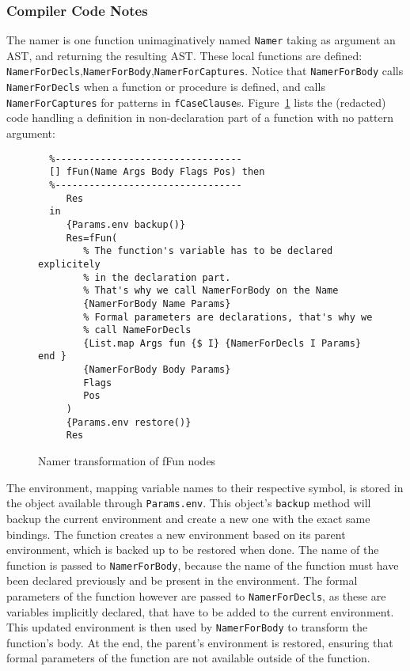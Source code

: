 \documentclass[a4paper]{memoir}
\begin{document}


\subsubsection{Compiler Code Notes}
The namer is one function unimaginatively named \lstinline!Namer! taking as argument an AST, and returning the resulting AST.
These local functions are defined: \lstinline!NamerForDecls!,\lstinline!NamerForBody!,\lstinline!NamerForCaptures!.
Notice that \lstinline!NamerForBody! calls \lstinline!NamerForDecls! when a function or procedure is
defined, and calls \lstinline!NamerForCaptures! for patterns in \lstinline!fCaseClause!s. 
Figure~\ref{fig:namer:ffun} lists the (redacted) code handling a definition in non-declaration part of a
function with no pattern argument:

\begin{figure}[h]
\begin{lstlisting}
  %---------------------------------
  [] fFun(Name Args Body Flags Pos) then
  %---------------------------------
     Res
  in
     {Params.env backup()} 
     Res=fFun(
        % The function's variable has to be declared explicitely 
        % in the declaration part.
        % That's why we call NamerForBody on the Name
        {NamerForBody Name Params}
        % Formal parameters are declarations, that's why we 
        % call NameForDecls
        {List.map Args fun {$ I} {NamerForDecls I Params} end }
        {NamerForBody Body Params}
        Flags
        Pos
     )
     {Params.env restore()}
     Res
\end{lstlisting}
\caption{Namer transformation of fFun nodes}
\label{fig:namer:ffun}
\end{figure}


The environment, mapping variable names to their respective symbol, is stored in
the object available through \lstinline!Params.env!. This object's
\lstinline!backup! method will backup the current environment and create a new
one with the exact same bindings.
The function creates a new environment based on its parent environment, which is
backed up to be restored when done. The name of the function is passed to \lstinline!NamerForBody!, because the name of the function must have been declared previously and be present in the environment. 
The formal parameters of the function however are passed to \lstinline!NamerForDecls!, as these are variables implicitly declared, that have to be added to the current environment. This updated environment is then used by \lstinline!NamerForBody! to transform the function's body.
At the end, the parent's environment is restored, ensuring that formal parameters of the function are not available outside of the function.
\end{document}

